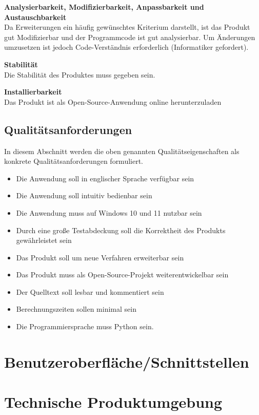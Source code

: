 \documentclass[parskip=full]{scrartcl} %
\begin{document}
\textbf{Analysierbarkeit, Modifizierbarkeit, Anpassbarkeit und Austauschbarkeit}\\
Da Erweiterungen ein häufig gewünschtes Kriterium darstellt, ist das Produkt gut Modifizierbar und der Programmcode ist gut analysierbar. Um Änderungen umzusetzen ist jedoch Code-Verständnis erforderlich (Informatiker gefordert).

\textbf{Stabilität}\\
Die Stabilität des Produktes muss gegeben sein.

\textbf{Installierbarkeit}\\
Das Produkt ist als Open-Source-Anwendung online herunterzuladen



\subsection{Qualitätsanforderungen}
In diesem Abschnitt werden die oben genannten Qualitätseigenschaften als konkrete Qualitätsanforderungen formuliert.

\begin{itemize}
    \item Die Anwendung soll in englischer Sprache verfügbar sein
    \item Die Anwendung soll intuitiv bedienbar sein
    \item Die Anwendung muss auf Windows 10 und 11 nutzbar sein
    \item Durch eine große Testabdeckung soll die Korrektheit des Produkts gewährleistet sein
    \item Das Produkt soll um neue Verfahren erweiterbar sein
    \item Das Produkt muss als Open-Source-Projekt weiterentwickelbar sein
    \item Der Quelltext soll lesbar und kommentiert sein
    \item Berechnungszeiten sollen minimal sein
    \item Die Programmiersprache muss Python sein.
\end{itemize}

\newpage



\section{Benutzeroberfläche/Schnittstellen}
\newpage



\section{Technische Produktumgebung}
\end{document}
